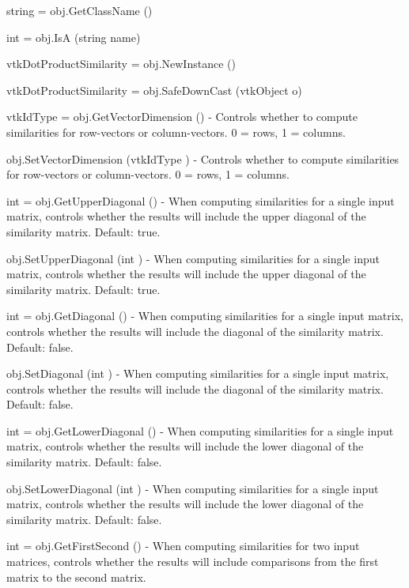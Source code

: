 \begin{DoxyItemize}
\item {\ttfamily string = obj.\-Get\-Class\-Name ()}  
\item {\ttfamily int = obj.\-Is\-A (string name)}  
\item {\ttfamily vtk\-Dot\-Product\-Similarity = obj.\-New\-Instance ()}  
\item {\ttfamily vtk\-Dot\-Product\-Similarity = obj.\-Safe\-Down\-Cast (vtk\-Object o)}  
\item {\ttfamily vtk\-Id\-Type = obj.\-Get\-Vector\-Dimension ()} -\/ Controls whether to compute similarities for row-\/vectors or column-\/vectors. 0 = rows, 1 = columns.  
\item {\ttfamily obj.\-Set\-Vector\-Dimension (vtk\-Id\-Type )} -\/ Controls whether to compute similarities for row-\/vectors or column-\/vectors. 0 = rows, 1 = columns.  
\item {\ttfamily int = obj.\-Get\-Upper\-Diagonal ()} -\/ When computing similarities for a single input matrix, controls whether the results will include the upper diagonal of the similarity matrix. Default\-: true.  
\item {\ttfamily obj.\-Set\-Upper\-Diagonal (int )} -\/ When computing similarities for a single input matrix, controls whether the results will include the upper diagonal of the similarity matrix. Default\-: true.  
\item {\ttfamily int = obj.\-Get\-Diagonal ()} -\/ When computing similarities for a single input matrix, controls whether the results will include the diagonal of the similarity matrix. Default\-: false.  
\item {\ttfamily obj.\-Set\-Diagonal (int )} -\/ When computing similarities for a single input matrix, controls whether the results will include the diagonal of the similarity matrix. Default\-: false.  
\item {\ttfamily int = obj.\-Get\-Lower\-Diagonal ()} -\/ When computing similarities for a single input matrix, controls whether the results will include the lower diagonal of the similarity matrix. Default\-: false.  
\item {\ttfamily obj.\-Set\-Lower\-Diagonal (int )} -\/ When computing similarities for a single input matrix, controls whether the results will include the lower diagonal of the similarity matrix. Default\-: false.  
\item {\ttfamily int = obj.\-Get\-First\-Second ()} -\/ When computing similarities for two input matrices, controls whether the results will include comparisons from the first matrix to the second matrix.  

\end{DoxyItemize}
